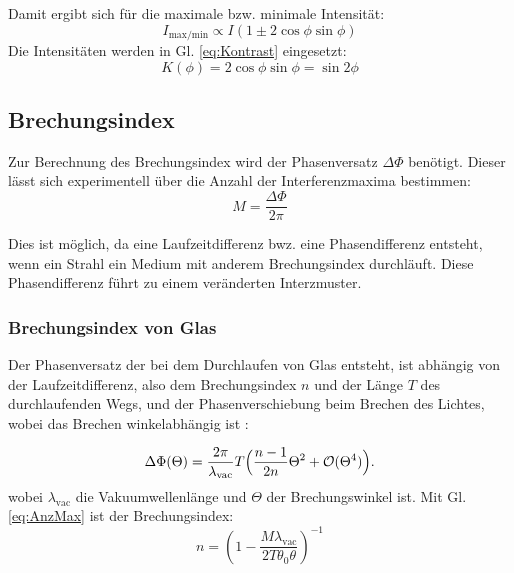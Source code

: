 Damit ergibt sich für die maximale bzw. minimale Intensität:
\begin{equation}
  I_{\text{max/min}} \propto I(1\pm 2\cos{\phi}\sin{\phi})
  \label{eq:imaxmin}
\end{equation}
\noindent Die Intensitäten werden in Gl. \eqref{eq:Kontrast} eingesetzt:
\begin{equation}
  \label{eqn:K}
  K(\phi)=2\cos{\phi}\sin{\phi}=\sin{2\phi}
\end{equation}

\subsection{Brechungsindex}%
Zur Berechnung des Brechungsindex wird der Phasenversatz $\Delta \Phi$ benötigt.
Dieser lässt sich experimentell über die Anzahl der Interferenzmaxima bestimmen:
\begin{equation}
  M=\frac{\Delta \Phi}{2\pi}
  \label{eq:AnzMax}
\end{equation}

Dies ist möglich, 
da eine Laufzeitdifferenz bwz. eine Phasendifferenz entsteht,
wenn ein Strahl ein Medium mit anderem Brechungsindex durchläuft.
Diese Phasendifferenz führt zu einem veränderten Interzmuster.

\subsubsection{Brechungsindex von Glas}%
Der Phasenversatz der bei dem Durchlaufen von Glas entsteht,
ist abhängig von der Laufzeitdifferenz, 
also dem Brechungsindex $n$ und der Länge $T$ des durchlaufenden Wegs,
und der Phasenverschiebung beim Brechen des Lichtes,
wobei das Brechen winkelabhängig ist \cite{V64}:

\begin{equation}
\Delta \Phi
(\Theta)=\frac{2\pi}{\lambda_{\text{vac}}}T\Bigl(\frac{n-1}{2n}\Theta^2+\mathcal{O}(\Theta^4)   \Bigr) .
\label{eq:nGlas}
\end{equation}
\noindent wobei $\lambda_{\text{vac}}$ die Vakuumwellenlänge 
und $\Theta$ der Brechungswinkel ist.
Mit Gl. \eqref{eq:AnzMax} ist der Brechungsindex:
\begin{equation}
  n = \left(1 - \frac{M \lambda_{\text{vac}}}{2 T \theta_0 \theta}\right)^{-1} 
  \label{eq:n_glas}
\end{equation}


